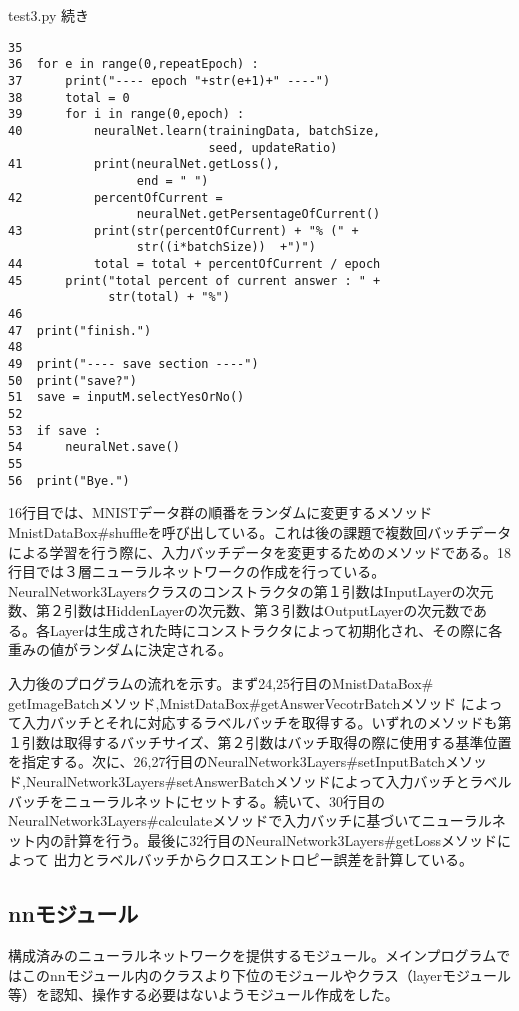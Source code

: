 \documentclass{ujarticle} %
\begin{document}
\begin{itembox}[l]{test3.py 続き}
  \begin{verbatim}
35
36  for e in range(0,repeatEpoch) :
37      print("---- epoch "+str(e+1)+" ----")
38      total = 0
39      for i in range(0,epoch) :
40          neuralNet.learn(trainingData, batchSize,
                            seed, updateRatio)
41          print(neuralNet.getLoss(),
                  end = " ")
42          percentOfCurrent =
                  neuralNet.getPersentageOfCurrent()
43          print(str(percentOfCurrent) + "% (" +
                  str((i*batchSize))  +")")
44          total = total + percentOfCurrent / epoch
45      print("total percent of current answer : " +
              str(total) + "%")
46
47  print("finish.")
48
49  print("---- save section ----")
50  print("save?")
51  save = inputM.selectYesOrNo()
52
53  if save :
54      neuralNet.save()
55
56  print("Bye.")
  \end{verbatim}
\end{itembox}

16行目では、MNISTデータ群の順番をランダムに変更するメソッドMnistDataBox\#shuffleを呼び出している。これは後の課題で複数回バッチデータによる学習を行う際に、入力バッチデータを変更するためのメソッドである。18行目では３層ニューラルネットワークの作成を行っている。NeuralNetwork3Layersクラスのコンストラクタの第１引数はInputLayerの次元数、第２引数はHiddenLayerの次元数、第３引数はOutputLayerの次元数である。各Layerは生成された時にコンストラクタによって初期化され、その際に各重みの値がランダムに決定される。

入力後のプログラムの流れを示す。まず24,25行目のMnistDataBox\# getImageBatchメソッド,MnistDataBox\#getAnswerVecotrBatchメソッド によって入力バッチとそれに対応するラベルバッチを取得する。いずれのメソッドも第１引数は取得するバッチサイズ、第２引数はバッチ取得の際に使用する基準位置を指定する。次に、26,27行目のNeuralNetwork3Layers\#setInputBatchメソッド,NeuralNetwork3Layers\#setAnswerBatchメソッドによって入力バッチとラベルバッチをニューラルネットにセットする。続いて、30行目のNeuralNetwork3Layers\#calculateメソッドで入力バッチに基づいてニューラルネット内の計算を行う。最後に32行目のNeuralNetwork3Layers\#getLossメソッドによって 出力とラベルバッチからクロスエントロピー誤差を計算している。

\subsection{nnモジュール}
構成済みのニューラルネットワークを提供するモジュール。メインプログラムではこのnnモジュール内のクラスより下位のモジュールやクラス（layerモジュール等）を認知、操作する必要はないようモジュール作成をした。
\end{document}
